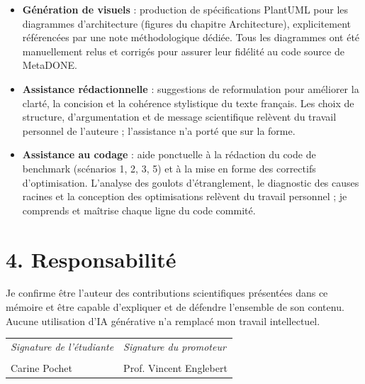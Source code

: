 \begin{itemize}
    \item \textbf{Génération de visuels} : production de spécifications PlantUML pour les diagrammes d'architecture (figures du chapitre Architecture), explicitement référencées par une note méthodologique dédiée. Tous les diagrammes ont été manuellement relus et corrigés pour assurer leur fidélité au code source de MetaDONE.
    \item \textbf{Assistance rédactionnelle} : suggestions de reformulation pour améliorer la clarté, la concision et la cohérence stylistique du texte français. Les choix de structure, d'argumentation et de message scientifique relèvent du travail personnel de l'auteure ; l'assistance n'a porté que sur la forme.
    \item \textbf{Assistance au codage} : aide ponctuelle à la rédaction du code de benchmark (scénarios 1, 2, 3, 5) et à la mise en forme des correctifs d'optimisation. L'analyse des goulots d'étranglement, le diagnostic des causes racines et la conception des optimisations relèvent du travail personnel ; je comprends et maîtrise chaque ligne du code commité.
\end{itemize}


\section*{4. Responsabilité}

Je confirme être l'auteur des contributions scientifiques présentées dans ce mémoire et être capable d'expliquer et de défendre l'ensemble de son contenu. Aucune utilisation d'IA générative n'a remplacé mon travail intellectuel.

\vspace{2cm}

\noindent\begin{tabular}{p{6cm}p{6cm}}
\textit{Signature de l'étudiante} & \textit{Signature du promoteur} \\[3cm]
\hrulefill & \hrulefill \\
Carine Pochet & Prof. Vincent Englebert \\
\end{tabular}
